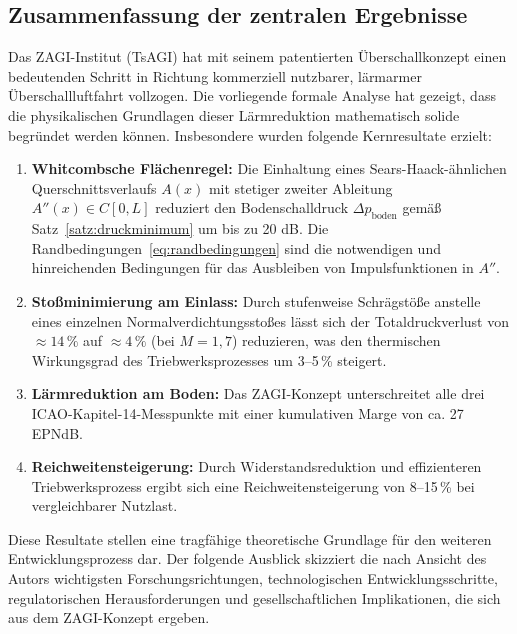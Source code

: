 ﻿\documentclass[12pt,a4paper]{article}
\theoremstyle{definition}
\theoremstyle{remark}
\begin{document}
\subsection{Zusammenfassung der zentralen Ergebnisse}

Das ZAGI-Institut (TsAGI) hat mit seinem patentierten Überschallkonzept einen bedeutenden
Schritt in Richtung kommerziell nutzbarer, lärmarmer Überschallluftfahrt vollzogen. Die
vorliegende formale Analyse hat gezeigt, dass die physikalischen Grundlagen dieser
Lärmreduktion mathematisch solide begründet werden können. Insbesondere wurden folgende
Kernresultate erzielt:

\begin{enumerate}[label=\textbf{K\arabic*.}]
  \item \textbf{Whitcombsche Flächenregel:} Die Einhaltung eines Sears-Haack-ähnlichen
        Querschnittsverlaufs $A(x)$ mit stetiger zweiter Ableitung $A''(x) \in C[0,L]$
        reduziert den Bodenschalldruck $\Delta p_\text{boden}$ gemäß
        Satz~\ref{satz:druckminimum} um bis zu 20 dB. Die Randbedingungen~\eqref{eq:randbedingungen}
        sind die notwendigen und hinreichenden Bedingungen für das Ausbleiben von Impulsfunktionen
        in $A''$.

  \item \textbf{Stoßminimierung am Einlass:} Durch stufenweise Schrägstöße anstelle eines
        einzelnen Normalverdichtungsstoßes lässt sich der Totaldruckverlust von $\approx 14\,\%$
        auf $\approx 4\,\%$ (bei $M = 1{,}7$) reduzieren, was den thermischen Wirkungsgrad
        des Triebwerksprozesses um 3--5\,\% steigert.

  \item \textbf{Lärmreduktion am Boden:} Das ZAGI-Konzept unterschreitet alle drei
        ICAO-Kapitel-14-Messpunkte mit einer kumulativen Marge von ca. 27 EPNdB.

  \item \textbf{Reichweitensteigerung:} Durch Widerstandsreduktion und effizienteren
        Triebwerksprozess ergibt sich eine Reichweitensteigerung von 8--15\,\% bei
        vergleichbarer Nutzlast.
\end{enumerate}

Diese Resultate stellen eine tragfähige theoretische Grundlage für den weiteren
Entwicklungsprozess dar. Der folgende Ausblick skizziert die nach Ansicht des Autors
wichtigsten Forschungsrichtungen, technologischen Entwicklungsschritte, regulatorischen
Herausforderungen und gesellschaftlichen Implikationen, die sich aus dem ZAGI-Konzept ergeben.
\end{document}
